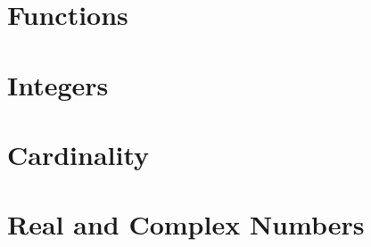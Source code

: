 \documentclass[10pt]{article}
\begin{document}
\newpage
\section{Functions}
\section{Integers}
\section{Cardinality}
\section{Real and Complex Numbers}




 





\hindex
\end{document}
